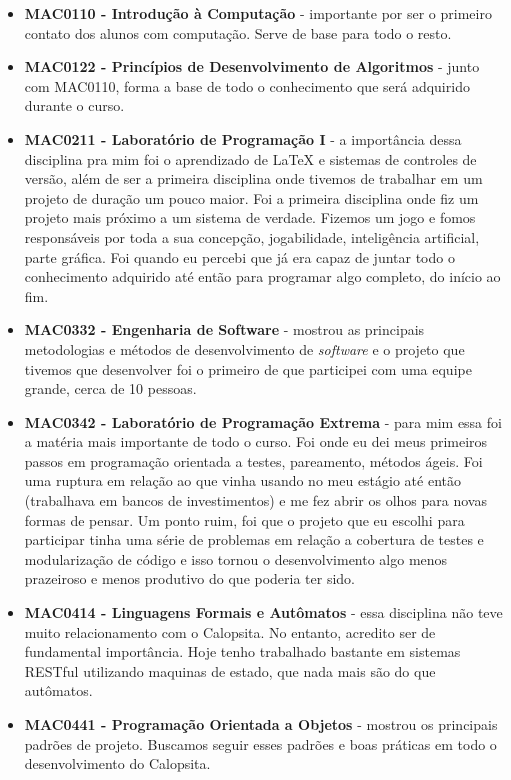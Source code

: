\documentclass[titlepage,a4paper]{article}
\newcommand{\software}{\textit{software}}
\newcommand{\calopsita}{Calopsita}
\begin{document}
\begin{itemize}
	\item{\textbf{MAC0110 - Introdução à Computação} - importante por ser o primeiro contato dos alunos com computação. Serve de base para todo o resto.}
	\item{\textbf{MAC0122 - Princípios de Desenvolvimento de Algoritmos} - junto com MAC0110, forma a base de todo o conhecimento que será adquirido durante o curso.}
	\item{\textbf{MAC0211 - Laboratório de Programação I} - a importância dessa disciplina pra mim foi o aprendizado de \LaTeX{} e sistemas de controles de versão, além de ser a primeira disciplina onde tivemos de trabalhar em um projeto de duração um pouco maior. Foi a primeira disciplina onde fiz um projeto mais próximo a um sistema de verdade. Fizemos um jogo e fomos responsáveis por toda a sua concepção, jogabilidade, inteligência artificial, parte gráfica. Foi quando eu percebi que já era capaz de juntar todo o conhecimento adquirido até então para programar algo completo, do início ao fim.}
	\item{\textbf{MAC0332 - Engenharia de Software} - mostrou as principais metodologias e métodos de desenvolvimento de \software{} e o projeto que tivemos que desenvolver  foi o primeiro de que participei com uma equipe grande, cerca de 10 pessoas.}
	\item{\textbf{MAC0342 - Laboratório de Programação Extrema} - para mim essa foi a matéria mais importante de todo o curso. Foi onde eu dei meus primeiros passos em programação orientada a testes, pareamento, métodos ágeis. Foi uma ruptura em relação ao que vinha usando no meu estágio até então (trabalhava em bancos de investimentos) e me fez abrir os olhos para novas formas de pensar. Um ponto ruim, foi que o projeto que eu escolhi para participar tinha uma série de problemas em relação a cobertura de testes e modularização de código e isso tornou o desenvolvimento algo menos prazeiroso e menos produtivo do que poderia ter sido.}
	\item{\textbf{MAC0414 - Linguagens Formais e Autômatos} - essa disciplina não teve muito relacionamento com o \calopsita{}. No entanto, acredito ser de fundamental importância. Hoje tenho trabalhado bastante em sistemas RESTful utilizando maquinas de estado, que nada mais são do que autômatos.}
	\item{\textbf{MAC0441 - Programação Orientada a Objetos} - mostrou os principais padrões de projeto. Buscamos seguir esses padrões e boas práticas em todo o desenvolvimento do \calopsita{}.}
\end{itemize}
\end{document}
